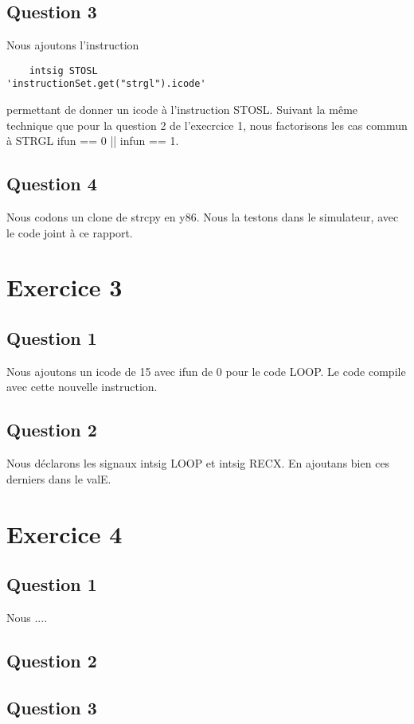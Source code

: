 \documentclass[a4paper,10pt]{article}
\begin{document}
\subsection{Question 3}
Nous ajoutons l'instruction
\begin{verbatim}
    intsig STOSL                     'instructionSet.get("strgl").icode'
\end{verbatim}
permettant de donner un icode à l'instruction STOSL. Suivant la même technique que pour la question 2 de l'execrcice 1, nous factorisons les cas commun à STRGL ifun == 0 || infun == 1.

\subsection{Question 4}
Nous codons un clone de strcpy en y86. Nous la testons dans le simulateur, avec le code joint à ce rapport.

\section{Exercice 3}
\subsection{Question 1}
Nous ajoutons un icode de 15 avec ifun de 0 pour le code LOOP. Le code compile avec cette nouvelle instruction.

\subsection{Question 2}
Nous déclarons les signaux intsig LOOP et intsig RECX. En ajoutans bien ces derniers dans le valE.

\section{Exercice 4}
\subsection{Question 1}
Nous ....

\subsection{Question 2}

\subsection{Question 3}
\end{document}
